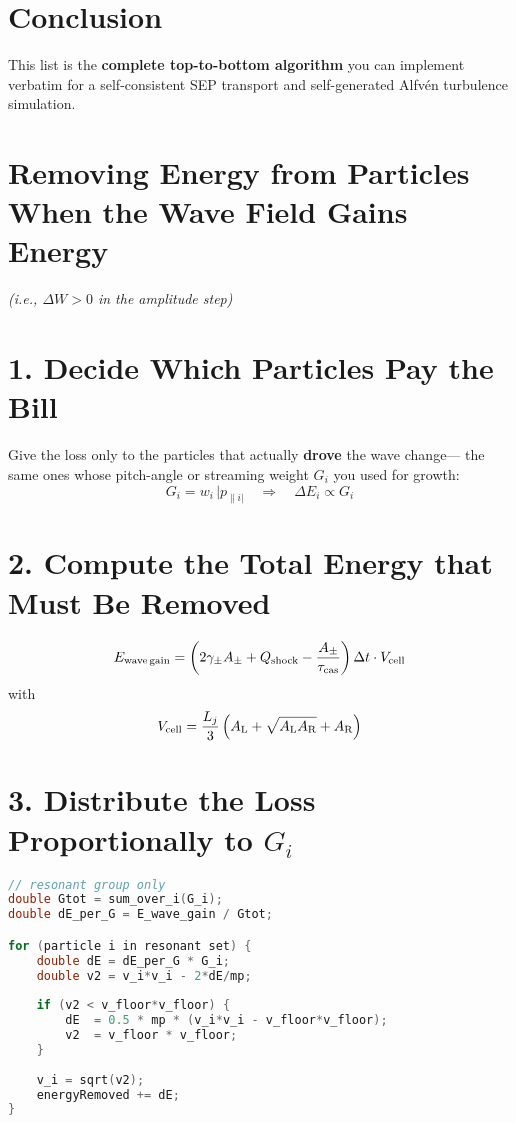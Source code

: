 \section*{Conclusion}
This list is the \textbf{complete top-to-bottom algorithm} you can implement verbatim for a self-consistent SEP transport and self-generated Alfvén turbulence simulation.


\section*{Removing Energy from Particles When the Wave Field Gains Energy}

\emph{(i.e., $\Delta W > 0$ in the amplitude step)}

\section*{1. Decide Which Particles Pay the Bill}

Give the loss only to the particles that actually \textbf{drove} the wave change—  
the same ones whose pitch-angle or streaming weight $G_i$ you used for growth:
\[
G_i = w_i\,|p_{\parallel i|} \quad \Longrightarrow \quad \Delta E_i \propto G_i
\]

\section*{2. Compute the Total Energy that Must Be Removed}

\[
E_{\text{wave\,gain}} = 
\left( 2\gamma_\pm A_\pm + Q_{\text{shock}} - \frac{A_\pm}{\tau_{\text{cas}}} \right)
\Delta t \cdot V_{\text{cell}}
\]
with
\[
V_{\text{cell}} = \frac{L_j}{3} \left( A_{\rm L} + \sqrt{A_{\rm L} A_{\rm R}} + A_{\rm R} \right)
\]

\section*{3. Distribute the Loss Proportionally to $G_i$}

\begin{lstlisting}[language=C++,basicstyle=\ttfamily\footnotesize]
// resonant group only
double Gtot = sum_over_i(G_i);
double dE_per_G = E_wave_gain / Gtot;

for (particle i in resonant set) {
    double dE = dE_per_G * G_i;
    double v2 = v_i*v_i - 2*dE/mp;
    
    if (v2 < v_floor*v_floor) {
        dE  = 0.5 * mp * (v_i*v_i - v_floor*v_floor);
        v2  = v_floor * v_floor;
    }
    
    v_i = sqrt(v2);
    energyRemoved += dE;
}
\end{lstlisting}

